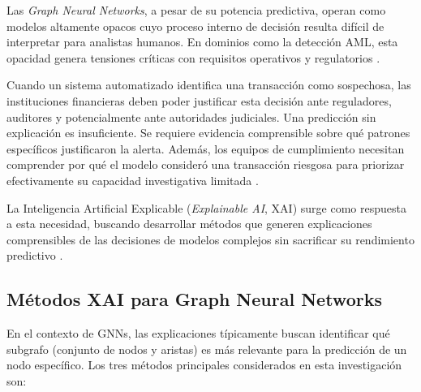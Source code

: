 Las \textit{Graph Neural Networks}, a pesar de su potencia predictiva, operan como modelos altamente opacos cuyo proceso interno de decisión resulta difícil de interpretar para analistas humanos. En dominios como la detección AML, esta opacidad genera tensiones críticas con requisitos operativos y regulatorios \cite{Gawantka2024AExplanations}.

Cuando un sistema automatizado identifica una transacción como sospechosa, las instituciones financieras deben poder justificar esta decisión ante reguladores, auditores y potencialmente ante autoridades judiciales. Una predicción sin explicación es insuficiente. Se requiere evidencia comprensible sobre qué patrones específicos justificaron la alerta. Además, los equipos de cumplimiento necesitan comprender por qué el modelo consideró una transacción riesgosa para priorizar efectivamente su capacidad investigativa limitada \cite{Unagar2025SurveyXAI, He2026AnDetection}.

La Inteligencia Artificial Explicable (\textit{Explainable AI}, XAI) surge como respuesta a esta necesidad, buscando desarrollar métodos que generen explicaciones comprensibles de las decisiones de modelos complejos sin sacrificar su rendimiento predictivo \cite{Adadi2018PeekingXAI}.

\subsection{Métodos XAI para Graph Neural Networks}

En el contexto de GNNs, las explicaciones típicamente buscan identificar qué subgrafo (conjunto de nodos y aristas) es más relevante para la predicción de un nodo específico. Los tres métodos principales considerados en esta investigación son:

